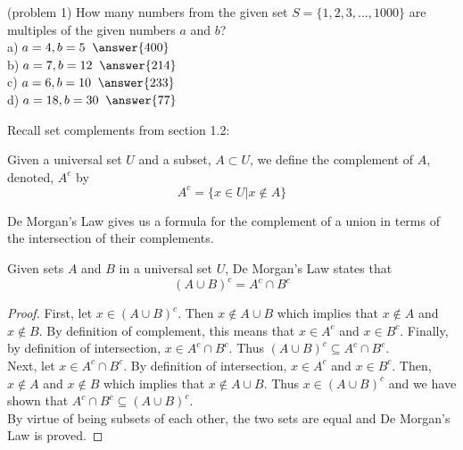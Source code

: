 \documentclass[handout]{ximera}
\begin{document}
\begin{problem}(problem 1)
How many numbers from the given set $S= \{1,2,3, \ldots, 1000\}$ are multiples of the given numbers $a$ and $b$?\\
a)$\; a = 4, b = 5 \;\; \answer{400}$\\
b)$\;  a = 7, b = 12 \;\; \answer{214}$\\
c)$\; a = 6, b = 10 \;\; \answer{233}$\\
d)$\;  a = 18, b = 30 \;\; \answer{77}$ \\
\end{problem}

Recall set complements from section 1.2:

\begin{definition}[Complement]
Given a universal set $U$ and a subset, $A \subset U$, we define the complement of $A$, denoted, $A^c$ by
\[
A^c = \{x \in U | x \notin A \}
\]
\end{definition}


\begin{image}
\end{image}


De Morgan's Law gives us a formula for the complement of a union in terms of the intersection of their complements.

\begin{proposition}
Given sets $A$ and $B$ in a universal set $U$, De Morgan's Law states that
\[
\left(A \cup B\right)^c = A^c \cap B^c
\]
\end{proposition}

\begin{proof}
First, let $x \in (A \cup B)^c$.  Then  $x \notin A \cup B$ which implies that $x \notin A$ and $x \notin B$. 
By definition of complement, this means that $x \in A^c$ and $x \in B^c$.   
Finally, by definition of intersection, $x \in A^c \cap B^c$.
Thus $(A \cup B)^c \subseteq A^c \cap B^c$.\\
Next, let $x \in A^c \cap B^c$. By definition of intersection, $x \in A^c$ and $x \in B^c$. 
Then, $x \notin A$ and $x \notin B$ which implies that $x \notin A \cup B$. Thus $x \in (A \cup B)^c$ and 
we have shown that  $A^c \cap B^c\subseteq (A \cup B)^c $.\\
By virtue of being subsets of each other, the two sets are equal and De Morgan's Law is proved.
\end{proof}
\end{document}
